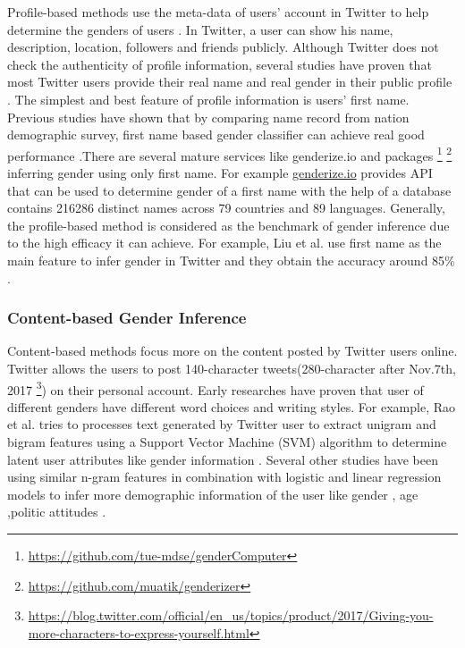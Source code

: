 \documentclass{article}
\begin{document}
Profile-based methods use the meta-data of users' account in Twitter to help determine the genders of users \cite{sloan2015tweets}. In Twitter, a user can show his name, description, location, followers and friends publicly. Although Twitter does not check the authenticity of profile information, several studies have proven that most Twitter users provide their real name and real gender in their public profile \cite{cesare2017detection}. The simplest and best feature of profile information is users' first name. Previous studies have shown that by comparing name record from nation demographic survey, first name based gender classifier can achieve real good performance \cite{sloan2013knowing, mislove2011understanding} .There are several mature services like genderize.io and packages \footnote{\url{https://github.com/tue-mdse/genderComputer}} \footnote{\url{https://github.com/muatik/genderizer}} inferring gender using only first name. For example \url{genderize.io} provides API that can be used to determine gender of a first name with the help of a database contains 216286 distinct names across 79 countries and 89 languages.  Generally, the profile-based method is considered as the benchmark of gender inference due to the high efficacy it can achieve.  For example, Liu et al. use first name as the main feature to infer gender in Twitter and they obtain the accuracy around 85\% \cite{liu2013s}. 

\subsubsection{Content-based Gender Inference}

Content-based methods focus more on the content posted by Twitter users online. Twitter allows the users to post 140-character tweets(280-character  after Nov.7th, 2017 \footnote{\url{https://blog.twitter.com/official/en_us/topics/product/2017/Giving-you-more-characters-to-express-yourself.html}}) on their personal account. Early researches have proven that user of different genders have different word choices and writing styles. For example, Rao et al. tries to processes text generated by Twitter user to extract unigram and bigram features using a Support Vector Machine (SVM) algorithm to determine latent user attributes like gender information \cite{rao2010classifying}. Several other studies have been using similar n-gram features in combination with logistic and linear regression models to infer more demographic information of the user like gender \cite{burger2011discriminating}, age \cite{nguyen2013old, nguyen2013tweetgenie} ,politic attitudes \cite{pennacchiotti2011democrats}.
\end{document}
